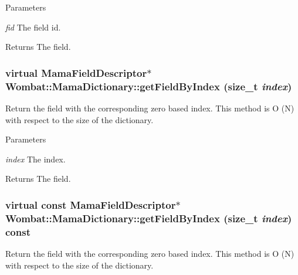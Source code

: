 \begin{DoxyParams}{Parameters}
\item[{\em fid}]The field id. \end{DoxyParams}
\begin{DoxyReturn}{Returns}
The field. 
\end{DoxyReturn}
\hypertarget{classWombat_1_1MamaDictionary_a08eacabaf6e6d36f7f504508f0553813}{
\subsubsection[{getFieldByIndex}]{\setlength{\rightskip}{0pt plus 5cm}virtual {\bf MamaFieldDescriptor}$\ast$ Wombat::MamaDictionary::getFieldByIndex (size\_\-t {\em index})}}
\label{classWombat_1_1MamaDictionary_a08eacabaf6e6d36f7f504508f0553813}


Return the field with the corresponding zero based index. This method is O (N) with respect to the size of the dictionary.


\begin{DoxyParams}{Parameters}
\item[{\em index}]The index. \end{DoxyParams}
\begin{DoxyReturn}{Returns}
The field. 
\end{DoxyReturn}
\hypertarget{classWombat_1_1MamaDictionary_a8790a6366d31dcfa964be65ec84d4ed1}{
\subsubsection[{getFieldByIndex}]{\setlength{\rightskip}{0pt plus 5cm}virtual const {\bf MamaFieldDescriptor}$\ast$ Wombat::MamaDictionary::getFieldByIndex (size\_\-t {\em index}) const}}
\label{classWombat_1_1MamaDictionary_a8790a6366d31dcfa964be65ec84d4ed1}


Return the field with the corresponding zero based index. This method is O (N) with respect to the size of the dictionary.


